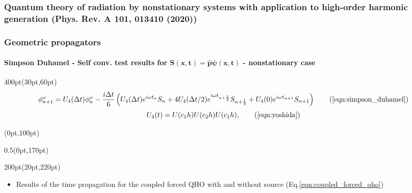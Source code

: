 \begin{frame}
\frametitle{Quantum theory of radiation by nonstationary systems 
	with application to high-order harmonic generation
        (Phys. Rev. A 101, 013410 (2020))}
\frametitle{Geometric propagators}
	\framesubtitle{Simpson Duhamel - 
	Self conv. test results for 
	$\mathbf{S(x,t) = \hat{p}\psi(x,t)}$ - nonstationary case }
\footnotesize
\begin{textblock*}{400pt}(30pt,60pt)
	\begin{equation}
		\phi^\omega_{n+1} = U_4(\Delta t) \phi^\omega_{n}
		- \frac{i\Delta t}{6}\left(
		  U_4(\Delta t)  e^{i\omega t_{n}}     S_{n}
		+ 4 U_4(\Delta t/2) e^{i\omega t_{n+\frac{1}{2}}} S_{n+\frac{1}{2}}
		+   U_4(0) e^{i\omega t_{n+1}} S_{n+1}
		\right)
		 \tag{\ref{eqn:simpson_duhamel}}
	\end{equation}
 	\begin{equation}
		U_4(t) =  U(c_1h)  U(c_2h)  U(c_1h),    
		 \tag{\ref{eqn:yoshida}}
 	\end{equation}
\end{textblock*}

\footnotesize
\begin{textblock*}{\linewidth}(0pt,100pt)
\end{textblock*}
\begin{textblock*}{0.5\linewidth}(0pt,170pt)
\end{textblock*}


\begin{textblock*}{200pt}(20pt,220pt)
	\begin{itemize}
	 \item Results of the time propagation for the coupled forced QHO
		 with and without source (Eq.\ref{eqn:coupled_forced_qho})
	\end{itemize}
\end{textblock*}



\end{frame}
